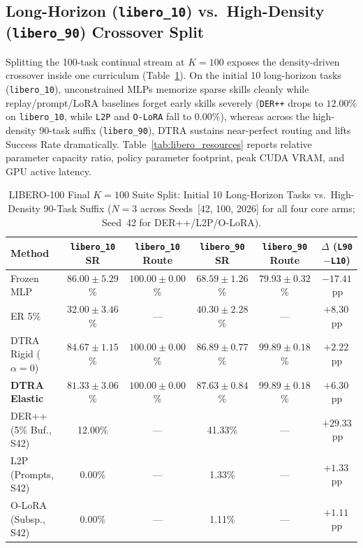 \documentclass[10pt]{article}
\newcommand{\tblfont}{\fontsize{8.5pt}{10.4pt}\selectfont}
\begin{document}
\subsection{Long-Horizon (\texttt{libero\_10}) vs.\ High-Density (\texttt{libero\_90}) Crossover Split}
Splitting the 100-task continual stream at $K=100$ exposes the density-driven crossover inside one curriculum (Table~\ref{tab:libero_split}). On the initial 10 long-horizon tasks (\texttt{libero\_10}), unconstrained MLPs memorize sparse skills cleanly while replay/prompt/LoRA baselines forget early skills severely (\texttt{DER++} drops to $12.00\%$ on \texttt{libero\_10}, while \texttt{L2P} and \texttt{O-LoRA} fall to $0.00\%$), whereas across the high-density 90-task suffix (\texttt{libero\_90}), DTRA sustains near-perfect routing and lifts Success Rate dramatically. Table~\ref{tab:libero_resources} reports relative parameter capacity ratio, policy parameter footprint, peak CUDA VRAM, and GPU active latency.

\begin{table}[ht!]
  \centering
  \caption{LIBERO-100 Final $K=100$ Suite Split: Initial 10 Long-Horizon Tasks vs.\ High-Density 90-Task Suffix ($N=3$ across Seeds~[42, 100, 2026] for all four core arms; Seed~42 for DER++/L2P/O-LoRA).}
  \label{tab:libero_split}
  \tblfont
  \setlength{\tabcolsep}{3.0pt}
  \begin{tabular}{lccccc}
    \toprule
    \textbf{Method} & \textbf{\texttt{libero\_10} SR} & \textbf{\texttt{libero\_10} Route} & \textbf{\texttt{libero\_90} SR} & \textbf{\texttt{libero\_90} Route} & \textbf{$\Delta$ (\texttt{L90}$-$\texttt{L10})} \\
    \midrule
    Frozen MLP & $86.00 \pm 5.29$\% & $100.00 \pm 0.00$\% & $68.59 \pm 1.26$\% & $79.93 \pm 0.32$\% & $-17.41$\,pp \\
    ER 5\% & $32.00 \pm 3.46$\% & --- & $40.30 \pm 2.28$\% & --- & $+8.30$\,pp \\
    DTRA Rigid ($\alpha=0$) & $84.67 \pm 1.15$\% & $100.00 \pm 0.00$\% & $86.89 \pm 0.77$\% & $99.89 \pm 0.18$\% & $+2.22$\,pp \\
    \textbf{DTRA Elastic} & $81.33 \pm 3.06$\% & $100.00 \pm 0.00$\% & $87.63 \pm 0.84$\% & $99.89 \pm 0.18$\% & $+6.30$\,pp \\
    \midrule
    DER++ (5\% Buf., S42) & 12.00\% & --- & 41.33\% & --- & $+29.33$\,pp \\
    L2P (Prompts, S42) & 0.00\% & --- & 1.33\% & --- & $+1.33$\,pp \\
    O-LoRA (Subsp., S42) & 0.00\% & --- & 1.11\% & --- & $+1.11$\,pp \\
    \bottomrule
  \end{tabular}
\end{table}
\end{document}
